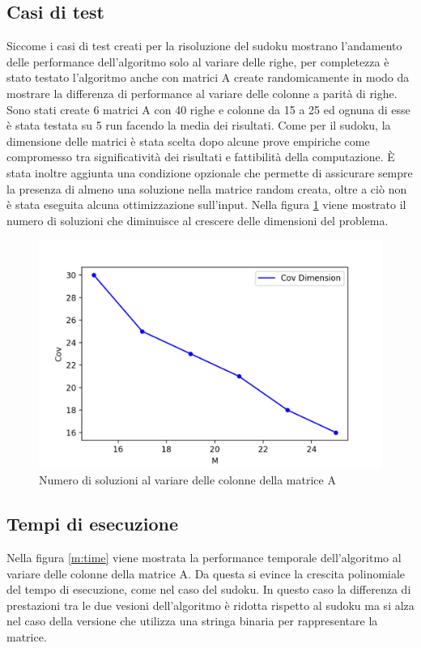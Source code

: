 \subsection{Casi di test}
Siccome i casi di test creati per la risoluzione del sudoku mostrano l'andamento delle performance dell'algoritmo solo al variare delle righe, per completezza è stato testato l'algoritmo anche con matrici A create randomicamente in modo da mostrare la differenza di performance al variare delle colonne a parità di righe. Sono stati create 6 matrici A con 40 righe e colonne da 15 a 25 ed ognuna di esse è stata testata su 5 run facendo la media dei risultati. Come per il sudoku, la dimensione delle matrici è stata scelta dopo alcune prove empiriche come compromesso tra significatività dei risultati e fattibilità della computazione. È stata inoltre aggiunta una condizione opzionale che permette di assicurare sempre la presenza di almeno una soluzione nella matrice random creata, oltre a ciò non è stata eseguita alcuna ottimizzazione sull'input. Nella figura \ref{m:cov} viene mostrato il numero di soluzioni che diminuisce al crescere delle dimensioni del problema.

\begin{figure}[h!]
\centering
\includegraphics[width=0.9\linewidth]{figures/random/r_col_cov.png}
\caption{Numero di soluzioni al variare delle colonne della matrice A}
\label{m:cov}
\end{figure}


\subsection{Tempi di esecuzione}
Nella figura \ref{m:time} viene mostrata la performance temporale dell'algoritmo al variare delle colonne della matrice A. Da questa si evince la crescita polinomiale del tempo di esecuzione, come nel caso del sudoku. In questo caso la differenza di prestazioni tra le due vesioni dell'algoritmo è ridotta rispetto al sudoku ma si alza nel caso della versione che utilizza una stringa binaria per rappresentare la matrice.

